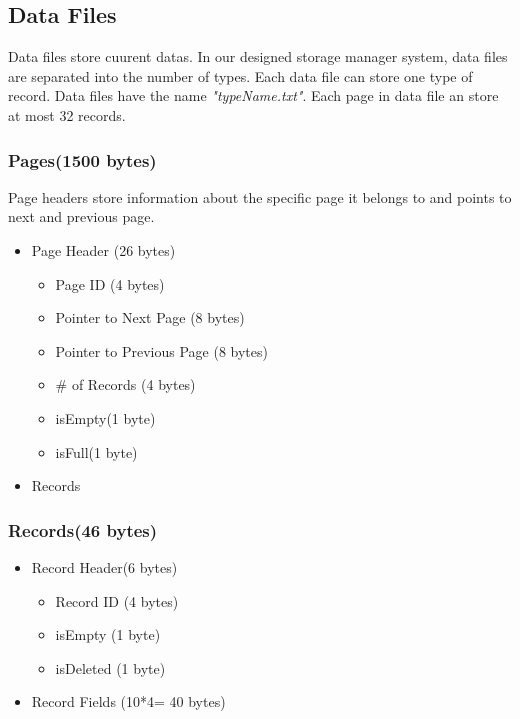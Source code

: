 \documentclass{article}
\newcounter{points}
\begin{document}
    \subsection{Data Files}
        Data files store cuurent datas. In our designed storage manager system, data files are separated into the number of types. Each data file can store one type of record. Data files have the name \emph{"typeName.txt"}. Each page in data file an store at most 32 records.
        \subsubsection{Pages(1500 bytes)}
            Page headers store information about the specific page it belongs to and points to next and previous page.
            \begin{itemize}
              \item Page Header (26 bytes)
                \begin{itemize}
                     \item Page ID (4 bytes)
                     \item Pointer to Next Page (8 bytes)
                     \item Pointer to Previous Page (8 bytes)
                     \item \# of Records (4 bytes)
                     \item isEmpty(1 byte)
                     \item isFull(1 byte)
                \end{itemize}
              \item Records 
            \end{itemize}
        \subsubsection{Records(46 bytes)}
            \begin{itemize}
              \item Record Header(6 bytes)
                \begin{itemize}
                     \item Record ID (4 bytes)
                    \item isEmpty (1 byte)
                    \item isDeleted (1 byte)
                \end{itemize}
              \item Record Fields (10*4= 40 bytes)
            \end{itemize}
\end{document}
